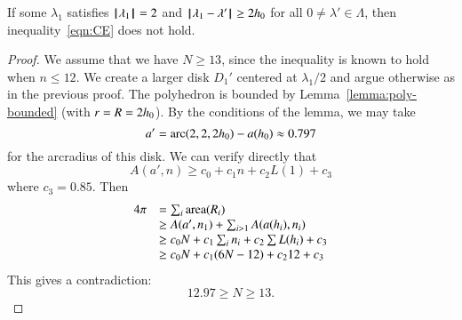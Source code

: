 \begin{lemma}\label{300}\label{lemma:D'}  
If some $\lambda_1$ satisfies ${{\hskip0.1em|\hskip-0.15em|\hskip0.1em}\lambda_1{\hskip0.1em|\hskip-0.15em|\hskip0.1em}}=2$ and
${\hskip0.1em|\hskip-0.15em|\hskip0.1em}\lambda_1 - \lambda'{\hskip0.1em|\hskip-0.15em|\hskip0.1em}\ge 2{h_0}$ for all $0\ne\lambda'\in\Lambda$,
then  inequality~\ref{eqn:CE} does not hold.
\end{lemma}

\begin{proof}  We assume that we have $N\ge 13$, since the inequality is known to hold when $n\le 12$.   We create a larger disk $D_1'$ centered at $\lambda_1/2$ and argue otherwise as in the previous proof.  The polyhedron is bounded by Lemma~\ref{lemma:poly-bounded} (with $r=R=2{h_0}$).  By the conditions of the lemma, we may take 
$$a'=\operatorname{arc}(2,2,2{h_0})-a({h_0}) \approx 0.797$$
for the arcradius of this disk.  We can verify directly that~\cite[cc:alin2]{hales:2009:nonlinear} %
$$A(a',n) \ge c_0 + c_1 n + c_2 L(1) + c_3$$
where $c_3 = 0.85$.
Then 
$$
\begin{array}{lll}
4\pi &= \sum_i{\operatorname{area}}(R_i)\\
     &\ge A(a',n_1)+\sum_{i>1} A(a(h_i),n_i) \\
     &\ge  c_0 N +c_1\sum_i n_i + c_2 \sum L(h_i) + c_3\\
     &\ge c_0 N +c_1 (6N-12) + c_2 12 + c_3\\
\end{array}
$$
This gives a contradiction:
$$
12.97 \ge N \ge 13.
$$
\end{proof}
